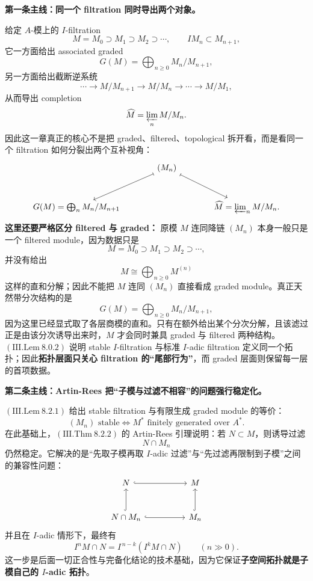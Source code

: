 \documentclass[a4paper]{ctexart}
\theoremstyle{definition}
\theoremstyle{analysis}
\theoremstyle{plain}
\begin{document}
\medskip

\textbf{第一条主线：同一个 filtration 同时导出两个对象。}

给定 \(A\)-模上的 \(I\)-filtration
\[
  M=M_0\supset M_1\supset M_2\supset \cdots,
  \qquad
  IM_n\subset M_{n+1},
\]
它一方面给出 associated graded
\[
  G(M)=\bigoplus_{n\ge 0} M_n/M_{n+1},
\]
另一方面给出截断逆系统
\[
  \cdots \to M/M_{n+1}\to M/M_n\to \cdots \to M/M_1,
\]
从而导出 completion
\[
  \widehat M=\varprojlim_n M/M_n.
\]
因此这一章真正的核心不是把 graded、filtered、topological 拆开看，而是看同一个 filtration 如何分裂出两个互补视角：
\[
\begin{tikzcd}[column sep=large, row sep=large]
& (M_n) \arrow[dl, mapsto] \arrow[dr, mapsto] & \\
G(M)=\bigoplus_n M_n/M_{n+1} & & \widehat M=\varprojlim_n M/M_n .
\end{tikzcd}
\]
\textbf{这里还要严格区分 filtered 与 graded：} 原模 \(M\) 连同降链 \((M_n)\) 本身一般只是一个 filtered module，因为数据只是
\[
  M=M_0\supset M_1\supset M_2\supset \cdots,
\]
并没有给出
\[
  M\cong \bigoplus_{n\ge 0} M^{(n)}
\]
这样的直和分解；因此不能把 \(M\) 连同 \((M_n)\) 直接看成 graded module。真正天然带分次结构的是
\[
  G(M)=\bigoplus_{n\ge 0} M_n/M_{n+1},
\]
因为这里已经显式取了各层商模的直和。只有在额外给出某个分次分解，且该滤过正是由该分次诱导出来时，\(M\) 才会同时兼具 graded 与 filtered 两种结构。
\((\mathrm{III.Lem}\ 8.0.2)\) 说明 stable \(I\)-filtration 与标准 \(I\)-adic filtration 定义同一个拓扑；因此\textbf{拓扑层面只关心 filtration 的“尾部行为”}，而 graded 层面则保留每一层的首项数据。

\medskip

\textbf{第二条主线：Artin-Rees 把“子模与过滤不相容”的问题强行稳定化。}

\((\mathrm{III.Lem}\ 8.2.1)\) 给出 stable filtration 与有限生成 graded module 的等价：
\[
  (M_n)\text{ stable}
  \iff
  M^* \text{ finitely generated over } A^*.
\]
在此基础上，\((\mathrm{III.Thm}\ 8.2.2)\) 的 Artin-Rees 引理说明：若 \(N\subset M\)，则诱导过滤
\[
  N\cap M_n
\]
仍然稳定。它解决的是“先取子模再取 \(I\)-adic 过滤”与“先过滤再限制到子模”之间的兼容性问题：
\[
\begin{tikzcd}[column sep=huge, row sep=large]
N \arrow[r, hook] & M \\
N\cap M_n \arrow[r, hook] \arrow[u, hook] & M_n \arrow[u, hook]
\end{tikzcd}
\]
并且在 \(I\)-adic 情形下，最终有
\[
  I^nM\cap N = I^{\,n-k}(I^kM\cap N)\qquad (n\gg 0).
\]
这一步是后面一切正合性与完备化结论的技术基础，因为它保证\textbf{子空间拓扑就是子模自己的 \(I\)-adic 拓扑}。
\end{document}
